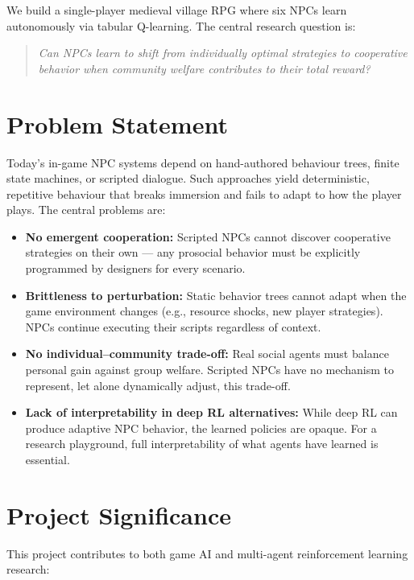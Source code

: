 \documentclass[12pt, a4paper, oneside]{report}
\begin{document}
We build a single-player medieval village RPG where six NPCs learn autonomously via tabular Q-learning. The central research question is:

\begin{quote}
\textit{Can NPCs learn to shift from individually optimal strategies to cooperative behavior when community welfare contributes to their total reward?}
\end{quote}

\section{Problem Statement}
\label{sec:problem-statement}

Today's in-game NPC systems depend on hand-authored behaviour trees, finite state machines, or scripted dialogue. Such approaches yield deterministic, repetitive behaviour that breaks immersion and fails to adapt to how the player plays. The central problems are:

\begin{itemize}
    \item \textbf{No emergent cooperation:} Scripted NPCs cannot discover cooperative strategies on their own --- any prosocial behavior must be explicitly programmed by designers for every scenario.
    \item \textbf{Brittleness to perturbation:} Static behavior trees cannot adapt when the game environment changes (e.g., resource shocks, new player strategies). NPCs continue executing their scripts regardless of context.
    \item \textbf{No individual--community trade-off:} Real social agents must balance personal gain against group welfare. Scripted NPCs have no mechanism to represent, let alone dynamically adjust, this trade-off.
    \item \textbf{Lack of interpretability in deep RL alternatives:} While deep RL can produce adaptive NPC behavior, the learned policies are opaque. For a research playground, full interpretability of what agents have learned is essential.
\end{itemize}

\section{Project Significance}
\label{sec:project-significance}

This project contributes to both game AI and multi-agent reinforcement learning research:
\end{document}
